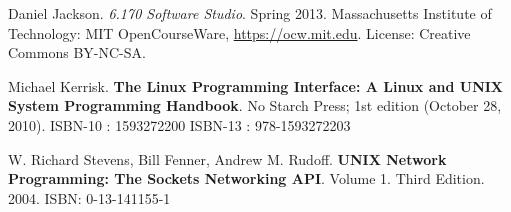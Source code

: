 \documentclass[10pt]{amsart}
\begin{document}
\begin{thebibliography}{9}
Daniel Jackson. \emph{6.170 Software Studio}. Spring 2013. Massachusetts Institute of Technology: MIT OpenCourseWare, \url{https://ocw.mit.edu}. License: Creative Commons BY-NC-SA.

Michael Kerrisk. \textbf{The Linux Programming Interface: A Linux and UNIX System Programming Handbook}. No Starch Press; 1st edition (October 28, 2010). ISBN-10 : 1593272200 ISBN-13 : 978-1593272203 

W. Richard Stevens, Bill Fenner, Andrew M. Rudoff. \textbf{UNIX Network Programming: The Sockets Networking API}. Volume 1. Third Edition. 2004. ISBN: 0-13-141155-1


\end{thebibliography}
\end{document}
